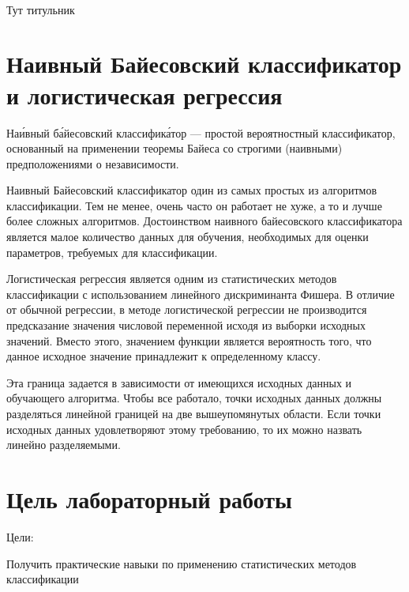 \documentclass[a4paper,12pt]{article}
\begin{document}
\begin{titlepage}
\newpage

\

Тут титульник
\end{titlepage}

\newpage
\tableofcontents
\setcounter{page}{2}



\newpage\section{Наивный Байесовский классификатор и логистическая регрессия} 
	Наи́вный ба́йесовский классифика́тор — простой вероятностный классификатор, основанный на применении теоремы Байеса со строгими (наивными) предположениями о независимости.

	\vspace{0.5cm}
	Наивный Байесовский классификатор один из самых простых из алгоритмов классификации. Тем не менее, очень часто он работает не хуже, а то и лучше более сложных алгоритмов. Достоинством наивного байесовского классификатора является малое количество данных для обучения, необходимых для оценки параметров, требуемых для классификации.

	\vspace{0.5cm}
	Логистическая регрессия является одним из статистических методов классификации с использованием линейного дискриминанта Фишера. В отличие от обычной регрессии, в методе логистической регрессии не производится предсказание значения числовой переменной исходя из выборки исходных значений. Вместо этого, значением функции является вероятность того, что данное исходное значение принадлежит к определенному классу. 
	
	\vspace{0.5cm}
	Эта граница задается в зависимости от имеющихся исходных данных и обучающего алгоритма. Чтобы все работало, точки исходных данных должны разделяться линейной границей на две вышеупомянутых области. Если точки исходных данных удовлетворяют этому требованию, то их можно назвать линейно разделяемыми. 
	
	
	
\newpage\section{Цель лабораторный работы} 
	Цели: 
	\vspace{0.5cm}
	
	Получить практические навыки по применению статистических методов классификации
	
\end{document}
